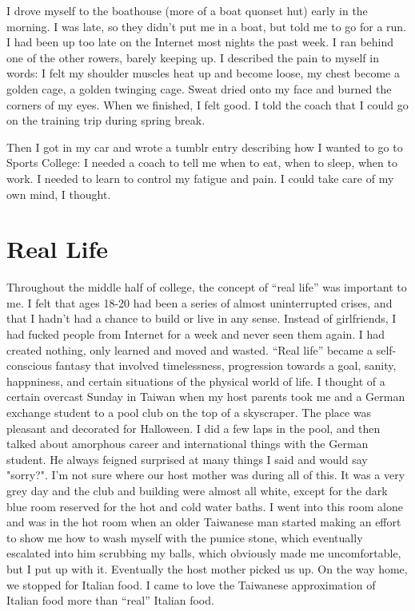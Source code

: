 \documentclass[12pt]{article}
\begin{document}
I drove myself to the boathouse (more of a boat quonset hut) early in the
morning.  I was late, so they didn't put me in a boat, but told me to go for a
run.  I had been up too late on the Internet most nights the past week.  I ran
behind one of the other rowers, barely keeping up.  I described the pain to
myself in words: I felt my shoulder muscles heat up and become loose, my chest
become a golden cage, a golden twinging cage.  Sweat dried onto my face and
burned the corners of my eyes.  When we finished, I felt good.  I told the coach
that I could go on the training trip during spring break.  

Then I got in my car and wrote a tumblr entry describing how I wanted to go to
Sports College: I needed a coach to tell me when to eat, when to sleep, when to
work.  I needed to learn to control my fatigue and pain.  I could take care of
my own mind, I thought.

\section{Real Life} 

Throughout the middle half of college, the concept of ``real life'' was
important to me.  I felt that ages 18-20 had been a series of almost
uninterrupted crises, and that I hadn't had a chance to build or live in any
sense.  Instead of girlfriends, I had fucked people from Internet for a week and
never seen them again.  I had created nothing, only learned and moved and
wasted.  ``Real life'' became a self-conscious fantasy that involved
timelessness, progression towards a goal, sanity, happniness, and certain
situations of the physical world of life.  I thought of a certain overcast
Sunday in Taiwan when my host parents took me and a German exchange student to a
pool club on the top of a skyscraper.  The place was pleasant and decorated for
Halloween.  I did a few laps in the pool, and then talked about amorphous career
and international things with the German student.  He always feigned surprised
at many things I said and would say "sorry?".  I'm not sure where our host
mother was during all of this.  It was a very grey day and the club and building
were almost all white, except for the dark blue room reserved for the hot and
cold water baths.  I went into this room alone and was in the hot room when an
older Taiwanese man started making an effort to show me how to wash myself with
the pumice stone, which eventually escalated into him scrubbing my balls, which
obviously made me uncomfortable, but I put up with it.  Eventually the host
mother picked us up.  On the way home, we stopped for Italian food.  I came to
love the Taiwanese approximation of Italian food more than ``real'' Italian
food.
\end{document}

